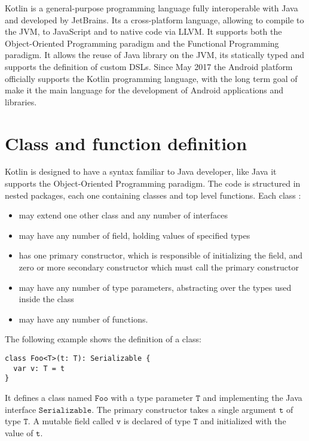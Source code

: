 Kotlin \cite{Kotlin} is a general-purpose programming language fully interoperable with Java and developed by JetBrains. Its a cross-platform language, allowing to compile to the JVM, to JavaScript and to native code via LLVM. It supports both the Object-Oriented Programming paradigm and the Functional Programming paradigm. It allows the reuse of Java library on the JVM, its statically typed and supports the definition of custom DSLs. Since May 2017 the Android platform officially supports the Kotlin programming language, with the long term goal of make it the main language for the development of Android applications and libraries.

\section{Class and function definition}

Kotlin is designed to have a syntax familiar to Java developer, like Java it supports the Object-Oriented Programming paradigm. The code is structured in nested packages, each one containing classes and top level functions. Each class :
\begin{itemize}
\item may extend one other class and any number of interfaces
\item may have any number of field, holding values of specified types
\item has one primary constructor, which is responsible of initializing the field, and zero or more secondary constructor which must call the primary constructor
\item may have any number of type parameters, abstracting over the types used inside the class
\item may have any number of functions.
\end{itemize}

The following example shows the definition of a class:
\begin{lstlisting}[language={kotac}]
class Foo<T>(t: T): Serializable {
  var v: T = t
}
\end{lstlisting}
It defines a class named $\mathtt{Foo}$ with a type parameter $\mathtt{T}$ and implementing the Java interface $\mathtt{Serializable}$. The primary constructor takes a single argument $\mathtt{t}$ of type $\mathtt{T}$. A mutable field called $\mathtt{v}$ is declared of type $\mathtt{T}$ and initialized with the value of $\mathtt{t}$.

